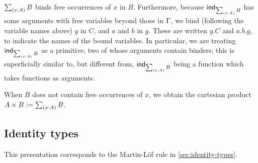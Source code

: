 
$\tsm{x:A} B$ binds free occurrences of $x$ in $B$. Furthermore, because
$\ind{\tsm{x:A} B}$ has some arguments with free variables beyond those in $\Gamma$,
we bind (following the variable names above) $y$ in $C$, and $a$ and $b$ in $g$.
These are written $y.C$ and $a.b.g$, to indicate the names of the bound
variables. In particular, we are treating $\ind{\tsm{x:A} B}$ as a primitive,
two of whose arguments contain binders; this is superficially similar to, but
different from, $\ind{\tsm{x:A} B}$ being a function which takes functions as
arguments.

When $B$ does not contain free occurrences of $x$, we obtain the cartesian
product $A \times B := \tsm{x:A} B$.

\subsection{Identity types}

This presentation corresponds to the Martin-L\"{o}f rule in
\autoref{sec:identity-types}.

